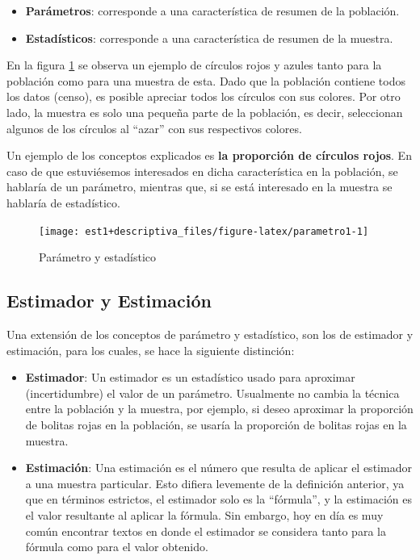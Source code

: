\documentclass[
  11pt,
]{book}
\providecommand{\tightlist}{%
  \setlength{\itemsep}{0pt}\setlength{\parskip}{0pt}}
\theoremstyle{definition}
\theoremstyle{definition}
\theoremstyle{definition}
\theoremstyle{definition}
\theoremstyle{remark}
\begin{document}
\begin{itemize}
\tightlist
\item
  \textbf{Parámetros}: corresponde a una característica de resumen de la población.
\item
  \textbf{Estadísticos}: corresponde a una característica de resumen de la muestra.
\end{itemize}

En la figura \ref{fig:parametro1} se observa un ejemplo de círculos rojos y azules tanto para la población como para una muestra de esta. Dado que la población contiene todos los datos (censo), es posible apreciar todos los círculos con sus colores. Por otro lado, la muestra es solo una pequeña parte de la población, es decir, seleccionan algunos de los círculos al ``azar'' con sus respectivos colores.

Un ejemplo de los conceptos explicados es \textbf{la proporción de círculos rojos}. En caso de que estuviésemos interesados en dicha característica en la población, se hablaría de un parámetro, mientras que, si se está interesado en la muestra se hablaría de estadístico.

\begin{figure}

{\centering \texttt{[image: est1+descriptiva\_files/figure-latex/parametro1-1]} 

}

\caption{Parámetro y estadístico}\label{fig:parametro1}
\end{figure}

\subsection{Estimador y Estimación}\label{topicos-conceptos-estimador-estimacion}

Una extensión de los conceptos de parámetro y estadístico, son los de estimador y estimación, para los cuales, se hace la siguiente distinción:

\begin{itemize}
\item
  \textbf{Estimador}: Un estimador es un estadístico usado para aproximar (incertidumbre) el valor de un parámetro. Usualmente no cambia la técnica entre la población y la muestra, por ejemplo, si deseo aproximar la proporción de bolitas rojas en la población, se usaría la proporción de bolitas rojas en la muestra.
\item
  \textbf{Estimación}: Una estimación es el número que resulta de aplicar el estimador a una muestra particular. Esto difiera levemente de la definición anterior, ya que en términos estrictos, el estimador solo es la ``fórmula'', y la estimación es el valor resultante al aplicar la fórmula. Sin embargo, hoy en día es muy común encontrar textos en donde el estimador se considera tanto para la fórmula como para el valor obtenido.
\end{itemize}
\end{document}
